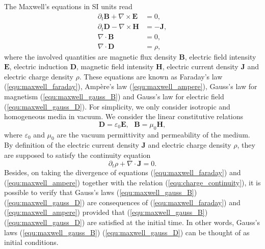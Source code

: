 \documentclass{article}
\begin{document}
The Maxwell's equations in SI units read
\begin{subequations}
\begin{align}
    \partial_t \mathbf{B} + \nabla \times \mathbf{E} &= 0, \label{equ:maxwell_faraday} \\ 
    \partial_t \mathbf{D} - \nabla \times \mathbf{H} &= -\mathbf{J}, \label{equ:maxwell_ampere} \\
    \nabla \cdot \mathbf{B} &= 0,  \label{equ:maxwell_gauss_B}\\
    \nabla \cdot \mathbf{D} &= \rho, \label{equ:maxwell_gauss_D}
\end{align}
\end{subequations}
where the involved quantities are magnetic flux density $\mathbf{B}$, electric field intensity $\mathbf{E}$, electric induction $\mathbf{D}$, magnetic field intensity $\mathbf{H}$, electric current density $\mathbf{J}$ and electric charge density $\rho$. These equations are known as Faraday's law (\ref{equ:maxwell_faraday}), Amp\`{e}re's law (\ref{equ:maxwell_ampere}), Gauss's law for magnetism (\ref{equ:maxwell_gauss_B}) and Gauss's law for electric field (\ref{equ:maxwell_gauss_D}). For simplicity, we only consider isotropic and homogeneous media in vacuum. We consider the linear constitutive relations 
\begin{equation} \label{equ:material_law}
    \mathbf{D} = \varepsilon_0 \mathbf{E}, \ \ \ \mathbf{B} = \mu_0\mathbf{H}, 
\end{equation}
where $\varepsilon_0$ and $\mu_0$ are the vacuum permittivity and permeability of the medium. By definition of the electric current density $\mathbf{J}$ and electric charge density $\rho$, they are supposed to satisfy the continuity equation
\begin{equation} \label{equ:charge_continuity}
    \partial_t\rho + \nabla \cdot \mathbf{J} = 0.
\end{equation}
Besides, on taking the divergence of equations (\ref{equ:maxwell_faraday}) and (\ref{equ:maxwell_ampere}) together with the relation (\ref{equ:charge_continuity}), it is possible to verify that Gauss's laws (\ref{equ:maxwell_gauss_B}) (\ref{equ:maxwell_gauss_D}) are consequences of (\ref{equ:maxwell_faraday}) and (\ref{equ:maxwell_ampere}) provided that (\ref{equ:maxwell_gauss_B}) (\ref{equ:maxwell_gauss_D}) are satisfied at the initial time. In other words, Gauss's laws (\ref{equ:maxwell_gauss_B}) (\ref{equ:maxwell_gauss_D}) can be thought of as initial conditions. 
\end{document}
